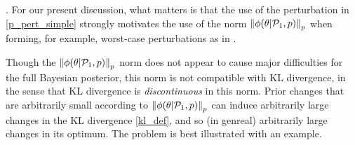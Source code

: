 %
.  For our present discussion, what matters is that the use of the perturbation
in \eqref{p_pert_simple} strongly motivates the use of the norm
$\left\Vert\phi(\theta \vert \mathcal{P}_{1}, p)\right\Vert_p$ when forming, for example, worst-case
perturbations as in .

Though the $\left\Vert\phi(\theta \vert \mathcal{P}_{1}, p)\right\Vert_p$ norm does not appear to cause
major difficulties for the full Bayesian posterior, this norm is not compatible
with KL divergence, in the sense that KL divergence is {\em discontinuous} in
this norm.  Prior changes that are arbitrarily small according to
$\left\Vert\phi(\theta \vert \mathcal{P}_{1}, p)\right\Vert_p$ can induce arbitrarily large changes in
the KL divergence \eqref{kl_def}, and so (in genreal) arbitrarily large
changes in its optimum.  The problem is best illustrated with an
example.

